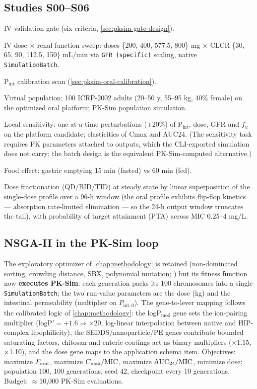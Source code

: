 \subsection{Studies S00--S06}
\begin{description}[labelwidth=2.2cm, style=nextline]
\item[S00] IV validation gate (six criteria, \cref{sec:pksim-gate-design}).
\item[S01] IV dose $\times$ renal-function sweep: doses \{200, 400, 577.5, 800\} mg $\times$ CLCR \{30, 65, 90, 112.5, 150\} mL/min via \texttt{GFR (specific)} scaling, native \texttt{SimulationBatch}.
\item[S02] P$_{\mathrm{int}}$ calibration scan (\cref{sec:pksim-oral-calibration}).
\item[S03] Virtual population: 100 ICRP-2002 adults (20--50 y, 55--95 kg, 40\% female) on the optimized oral platform; PK-Sim population simulation.
\item[S04] Local sensitivity: one-at-a-time perturbations ($\pm$20\%) of P$_{\mathrm{int}}$, dose, GFR and $f_u$ on the platform candidate; elasticities of Cmax and AUC24. (The  sensitivity task requires PK parameters attached to outputs, which the CLI-exported simulation does not carry; the batch design is the equivalent PK-Sim-computed alternative.)
\item[S05] Food effect: gastric emptying 15 min (fasted) vs 60 min (fed).
\item[S06] Dose fractionation (QD/BID/TID) at steady state by linear superposition of the single-dose profile over a 96-h window (the oral profile exhibits flip-flop kinetics --- absorption rate-limited elimination --- so the 24-h output window truncates the tail), with probability of target attainment (PTA) across MIC 0.25--4 mg/L.
\end{description}

\subsection{NSGA-II in the PK-Sim loop}
The exploratory optimizer of \cref{chap:methodology} is retained (non-dominated sorting, crowding distance, SBX, polynomial mutation; \citealp{Deb2002}) but its fitness function now \textbf{executes PK-Sim}: each generation packs its 100 chromosomes into a single \texttt{SimulationBatch}; the two run-value parameters are the dose (kg) and the intestinal permeability (multiplier on $P_{\mathrm{int},0}$). The gene-to-lever mapping follows the calibrated logic of \cref{chap:methodology}: the logP$_{\mathrm{mod}}$ gene sets the ion-pairing multiplier ($\mathrm{logP}' = +1.6 \Rightarrow \times 20$, log-linear interpolation between native and HIP-complex lipophilicity), the SEDDS/nanoparticle/PE genes contribute bounded saturating factors, chitosan and enteric coatings act as binary multipliers ($\times$1.15, $\times$1.10), and the dose gene maps to the application schema item. Objectives: maximize $F_{\mathrm{oral}}$, maximize $C_{\max}/\mathrm{MIC}$, maximize $\mathrm{AUC}_{24}/\mathrm{MIC}$, minimize dose; population 100, 100 generations, seed 42, checkpoint every 10 generations. Budget: $\approx$10,000 PK-Sim evaluations.

